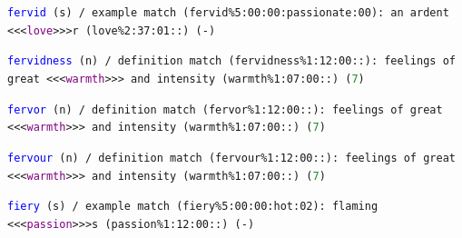 \documentclass[12pt,a4paper]{article}
\begin{document}
{%



\texttt{\textcolor{blue}{fervid} (s) / example match (fervid\%5:00:00:passionate:00): an ardent <<<\textcolor{purple}{love}>>>r (love\%2:37:01::) (-)}



\texttt{\textcolor{blue}{fervidness} (n) / definition match (fervidness\%1:12:00::): feelings of great <<<\textcolor{purple}{warmth}>>> and intensity (warmth\%1:07:00::) (\textcolor{ForestGreen}{7}) }

\texttt{\textcolor{blue}{fervor} (n) / definition match (fervor\%1:12:00::): feelings of great <<<\textcolor{purple}{warmth}>>> and intensity (warmth\%1:07:00::) (\textcolor{ForestGreen}{7})}

\texttt{\textcolor{blue}{fervour} (n) / definition match (fervour\%1:12:00::): feelings of great <<<\textcolor{purple}{warmth}>>> and intensity (warmth\%1:07:00::) (\textcolor{ForestGreen}{7})}

\texttt{\textcolor{blue}{fiery} (s) / example match (fiery\%5:00:00:hot:02): flaming <<<\textcolor{purple}{passion}>>>s (passion\%1:12:00::) (-) }




}
\end{document}
